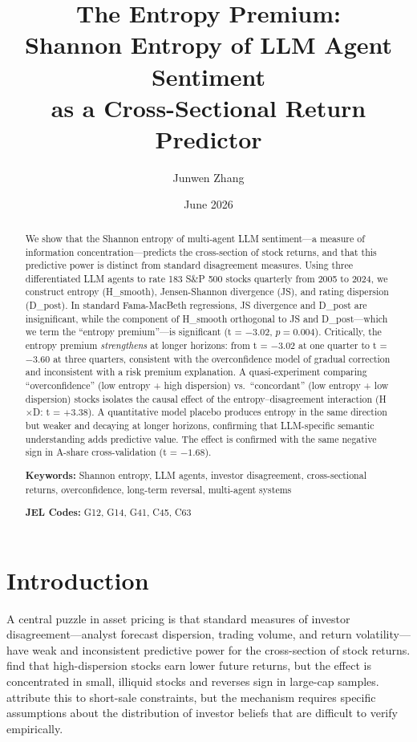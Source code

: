 \documentclass[12pt,a4paper]{article}
\title{\textbf{The Entropy Premium: \\Shannon Entropy of LLM Agent Sentiment \\as a Cross-Sectional Return Predictor}\vspace{0.5em}}
\author{Junwen Zhang}
\date{June 2026}
\begin{document}
\maketitle

\begin{abstract}
We show that the Shannon entropy of multi-agent LLM sentiment---a measure of information concentration---predicts the cross-section of stock returns, and that this predictive power is distinct from standard disagreement measures. Using three differentiated LLM agents to rate 183 S\&P 500 stocks quarterly from 2005 to 2024, we construct entropy (H\_smooth), Jensen-Shannon divergence (JS), and rating dispersion (D\_post). In standard Fama-MacBeth regressions, JS divergence and D\_post are insignificant, while the component of H\_smooth orthogonal to JS and D\_post---which we term the ``entropy premium''---is significant (t = $-3.02$, $p = 0.004$). Critically, the entropy premium \textit{strengthens} at longer horizons: from t = $-3.02$ at one quarter to t = $-3.60$ at three quarters, consistent with the \citet{Daniel1998} overconfidence model of gradual correction and inconsistent with a risk premium explanation. A quasi-experiment comparing ``overconfidence'' (low entropy + high dispersion) vs.\ ``concordant'' (low entropy + low dispersion) stocks isolates the causal effect of the entropy--disagreement interaction (H$\times$D: t = $+3.38$). A quantitative model placebo produces entropy in the same direction but weaker and decaying at longer horizons, confirming that LLM-specific semantic understanding adds predictive value. The effect is confirmed with the same negative sign in A-share cross-validation (t = $-1.68$).

\medskip
\noindent\textbf{Keywords:} Shannon entropy, LLM agents, investor disagreement, cross-sectional returns, overconfidence, long-term reversal, multi-agent systems

\medskip
\noindent\textbf{JEL Codes:} G12, G14, G41, C45, C63
\end{abstract}

\newpage

\section{Introduction}\label{sec:intro}

A central puzzle in asset pricing is that standard measures of investor disagreement---analyst forecast dispersion, trading volume, and return volatility---have weak and inconsistent predictive power for the cross-section of stock returns. \citet{Diether2002} find that high-dispersion stocks earn lower future returns, but the effect is concentrated in small, illiquid stocks and reverses sign in large-cap samples. \citet{Johnson2004} attribute this to short-sale constraints, but the mechanism requires specific assumptions about the distribution of investor beliefs that are difficult to verify empirically.
\end{document}
